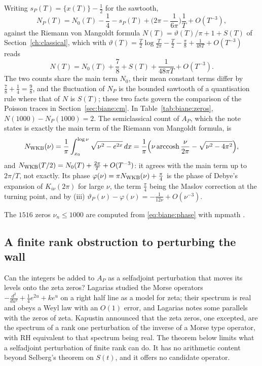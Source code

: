 Writing $s_P(T)=\{x(T)\}-\frac12$ for the sawtooth,
\[
N_P(T)=N_0(T)-\frac14-s_P(T)+\Big(2\pi-\frac1{6\pi}\Big)\frac1T+O(T^{-3}),
\]
against the Riemann von Mangoldt formula $N(T)=\vartheta(T)/\pi+1+S(T)$ of Section~\ref{ch:classical}, which with $\vartheta(T)=\frac T2\log\frac T{2\pi}-\frac T2-\frac\pi8+\frac1{48T}+O(T^{-3})$ reads
\[
N(T)=N_0(T)+\frac78+S(T)+\frac1{48\pi T}+O(T^{-3}).
\]
The two counts share the main term $N_0$, their mean constant terms differ by $\frac78+\frac14=\frac98$, and the fluctuation of $N_P$ is the bounded sawtooth of a quantisation rule where that of $N$ is $S(T)$; these two facts govern the comparison of the Poisson traces in Section~\ref{sec:biane:cm}. In Table~\ref{tab:biane:zeros}, $N(1000)-N_P(1000)=2$. The semiclassical count of $A_P$, which the note \cite{P26bia} states is exactly the main term of the Riemann von Mangoldt formula, is
\[
N_{\rm WKB}(\nu)=\frac1\pi\int_{x_0}^{\log\nu}\sqrt{\nu^2-e^{2x}}\,dx=\frac1\pi\Big(\nu\operatorname{arccosh}\frac\nu{2\pi}-\sqrt{\nu^2-4\pi^2}\Big),
\]
and $N_{\rm WKB}(T/2)=N_0(T)+\frac{2\pi}T+O(T^{-3})$: it agrees with the main term up to $2\pi/T$, not exactly. Its phase $\varphi(\nu)=\pi N_{\rm WKB}(\nu)+\frac\pi4$ is the phase of Debye's expansion of $K_{i\nu}(2\pi)$ for large $\nu$, the term $\frac\pi4$ being the Maslov correction at the turning point, and by (iii) $\vartheta_P(\nu)-\varphi(\nu)=-\frac1{12\nu}+O(\nu^{-3})$.

The $1516$ zeros $\nu_n\le1000$ are computed from \eqref{eq:biane:phase} with mpmath \cite{mpmath}.

\subsection{A finite rank obstruction to perturbing the wall}\label{sec:biane:nogo}

Can the integers be added to $A_P$ as a selfadjoint perturbation that moves its levels onto the zeta zeros? Lagarias \cite{Lagarias09} studied the Morse operators $-\frac{d^2}{du^2}+\frac14e^{2u}+ke^u$ on a right half line as a model for zeta; their spectrum is real and obeys a Weyl law with an $O(1)$ error, and Lagarias notes some parallels with the zeros of zeta. Kapustin \cite{Kapustin22} announced that the zeta zeros, one excepted, are the spectrum of a rank one perturbation of the inverse of a Morse type operator, with RH equivalent to that spectrum being real.
The theorem below limits what a selfadjoint perturbation of finite rank can do. It has no arithmetic content beyond Selberg's theorem on $S(t)$, and it offers no candidate operator.

